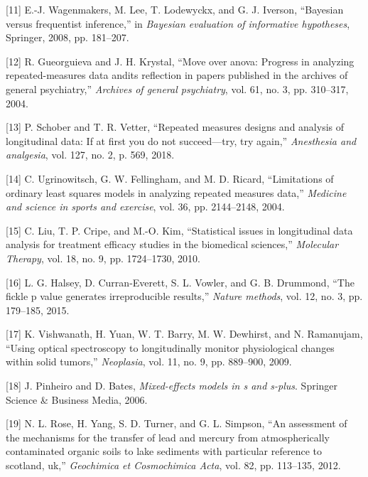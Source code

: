 \documentclass[
]{article}
\begin{document}
\leavevmode\hypertarget{ref-wagenmakers2008}{}%
{[}11{]} E.-J. Wagenmakers, M. Lee, T. Lodewyckx, and G. J. Iverson, ``Bayesian versus frequentist inference,'' in \emph{Bayesian evaluation of informative hypotheses}, Springer, 2008, pp. 181--207.

\leavevmode\hypertarget{ref-gueorguieva2004}{}%
{[}12{]} R. Gueorguieva and J. H. Krystal, ``Move over anova: Progress in analyzing repeated-measures data andits reflection in papers published in the archives of general psychiatry,'' \emph{Archives of general psychiatry}, vol. 61, no. 3, pp. 310--317, 2004.

\leavevmode\hypertarget{ref-schober2018}{}%
{[}13{]} P. Schober and T. R. Vetter, ``Repeated measures designs and analysis of longitudinal data: If at first you do not succeed---try, try again,'' \emph{Anesthesia and analgesia}, vol. 127, no. 2, p. 569, 2018.

\leavevmode\hypertarget{ref-ugrinowitsch2004}{}%
{[}14{]} C. Ugrinowitsch, G. W. Fellingham, and M. D. Ricard, ``Limitations of ordinary least squares models in analyzing repeated measures data,'' \emph{Medicine and science in sports and exercise}, vol. 36, pp. 2144--2148, 2004.

\leavevmode\hypertarget{ref-liu2010}{}%
{[}15{]} C. Liu, T. P. Cripe, and M.-O. Kim, ``Statistical issues in longitudinal data analysis for treatment efficacy studies in the biomedical sciences,'' \emph{Molecular Therapy}, vol. 18, no. 9, pp. 1724--1730, 2010.

\leavevmode\hypertarget{ref-halsey2015}{}%
{[}16{]} L. G. Halsey, D. Curran-Everett, S. L. Vowler, and G. B. Drummond, ``The fickle p value generates irreproducible results,'' \emph{Nature methods}, vol. 12, no. 3, pp. 179--185, 2015.

\leavevmode\hypertarget{ref-vishwanath2009}{}%
{[}17{]} K. Vishwanath, H. Yuan, W. T. Barry, M. W. Dewhirst, and N. Ramanujam, ``Using optical spectroscopy to longitudinally monitor physiological changes within solid tumors,'' \emph{Neoplasia}, vol. 11, no. 9, pp. 889--900, 2009.

\leavevmode\hypertarget{ref-pinheiro2006}{}%
{[}18{]} J. Pinheiro and D. Bates, \emph{Mixed-effects models in s and s-plus}. Springer Science \& Business Media, 2006.

\leavevmode\hypertarget{ref-rose2012}{}%
{[}19{]} N. L. Rose, H. Yang, S. D. Turner, and G. L. Simpson, ``An assessment of the mechanisms for the transfer of lead and mercury from atmospherically contaminated organic soils to lake sediments with particular reference to scotland, uk,'' \emph{Geochimica et Cosmochimica Acta}, vol. 82, pp. 113--135, 2012.
\end{document}
